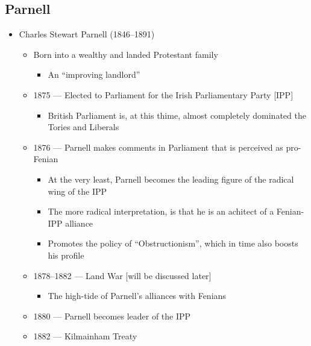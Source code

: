 \documentclass[12pt]{article}
\begin{document}
        \subsection{Parnell}
            \begin{itemize}
                \item Charles Stewart Parnell (1846--1891)
                \begin{itemize}
                    \item Born into a wealthy and landed Protestant family
                    \begin{itemize}
                        \item An ``improving landlord''
                    \end{itemize}
                    \item 1875 --- Elected to Parliament for the Irish Parliamentary Party [IPP]
                    \begin{itemize}
                        \item British Parliament is, at this thime, almost completely dominated the Tories and Liberals
                    \end{itemize}
                    \item 1876 --- Parnell makes comments in Parliament that is perceived as pro-Fenian
                    \begin{itemize}
                        \item At the very least, Parnell becomes the leading figure of the radical wing of the IPP
                        \item The more radical interpretation, is that he is an achitect of a Fenian-IPP alliance
                        \item Promotes the policy of ``Obstructionism'', which in time also boosts his profile
                    \end{itemize}
                    \item 1878--1882 --- Land War [will be discussed later]
                    \begin{itemize}
                        \item The high-tide of Parnell's alliances with Fenians
                    \end{itemize}
                    \item 1880 --- Parnell becomes leader of the IPP
                    \item 1882 --- Kilmainham Treaty
                    \begin{itemize}

\end{itemize}
\end{itemize}
\end{itemize}
\end{document}

